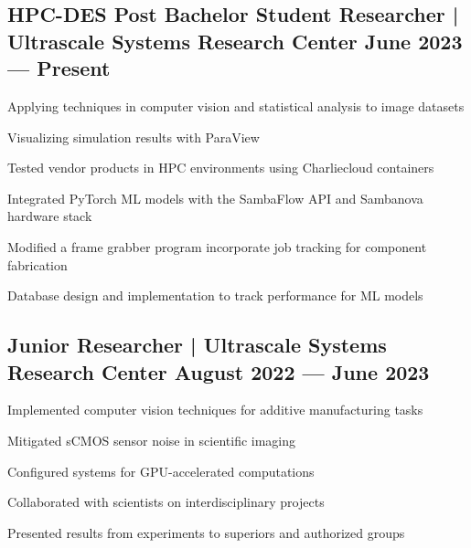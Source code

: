 \subsection{{HPC-DES Post Bachelor Student  Researcher | Ultrascale Systems Research Center \hfill June 2023 --- Present}}
\begin{zitemize}
\item Applying techniques in computer vision and statistical analysis to image datasets
\item Visualizing simulation results with ParaView
\item Tested vendor products in HPC environments using Charliecloud containers
\item Integrated PyTorch ML models with the SambaFlow API and Sambanova hardware stack
\item Modified a frame grabber program incorporate job tracking for component fabrication
\item Database design and implementation to track performance for ML models
\end{zitemize}

\subsection{{Junior Researcher | Ultrascale Systems Research Center \hfill August 2022 --- June 2023}}
\begin{zitemize}
\item Implemented computer vision techniques for additive manufacturing tasks
\item Mitigated sCMOS sensor noise in scientific imaging
\item Configured systems for GPU-accelerated computations
\item Collaborated with scientists on interdisciplinary projects
\item Presented results from experiments to superiors and authorized groups
\end{zitemize}

